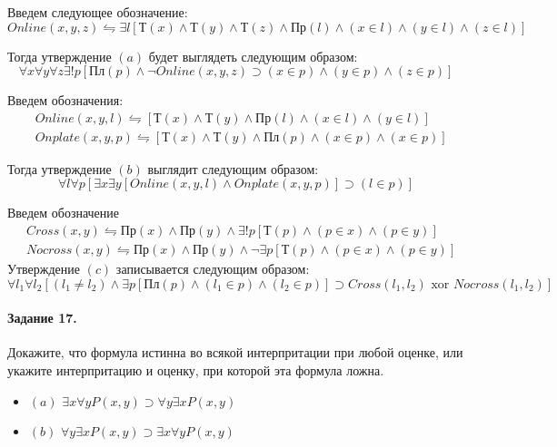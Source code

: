 \documentclass[a4paper,12pt]{article}
\begin{document}
\begin{Solution}
Введем следующее обозначение:
\[
	Online\left(x,y,z\right) \leftrightharpoons \exists l\left[\text{Т}\left(x\right)\land \text{Т}\left(y\right)\land\text{Т}\left(z\right)\land\text{Пр}\left(l\right)\land\left(x \in l\right)\land\left(y \in l\right)\land\left(z \in l\right)\right]
\]

Тогда утверждение $(a)$ будет выглядеть следующим образом:
\[
	\forall x \forall y \forall z \exists ! p \left[\text{Пл}\left(p\right) \land \neg Online\left(x,y,z\right)\supset\left(x \in p\right)\land\left(y \in p\right)\land\left(z \in p\right)\right]
\]

Введем обозначения:
\[
	\begin{split}
		& Online\left(x,y,l\right) \leftrightharpoons \left[\text{Т}\left(x\right)\land\text{Т}\left(y\right)\land\text{Пр}\left(l\right)\land\left(x \in l\right)\land\left(y \in l\right)\right] \\
		& Onplate\left(x,y,p\right) \leftrightharpoons \left[\text{Т}\left(x\right)\land\text{Т}\left(y\right)\land\text{Пл}\left(p\right)\land\left(x \in p\right)\land\left(x \in p\right)\right]
	\end{split}
\]

Тогда утверждение $(b)$ выглядит следующим образом:
\[
	\forall l \forall p \left[\exists x \exists y \left[Online\left(x,y,l\right)\land Onplate\left(x,y,p\right)\right]\supset\left(l \in p\right)\right]
\]

Введем обозначение
\[
	\begin{split}
		& Cross\left(x,y\right) \leftrightharpoons \text{Пр}\left(x\right)\land\text{Пр}\left(y\right)\land\exists !p \left[\text{Т}\left(p\right)\land\left(p \in x\right)\land\left(p \in y\right)\right] \\
		& Nocross\left(x,y\right) \leftrightharpoons \text{Пр}\left(x\right)\land\text{Пр}\left(y\right)\land\neg\exists p\left[\text{Т}\left(p\right)\land\left(p \in x\right)\land\left(p \in y\right)\right]
	\end{split}
\]
Утверждение $(c)$ записывается следующим образом:
\[
	\forall l_1 \forall l_2 \left[\left(l_1 \not= l_2\right)\land\exists p \left[\text{Пл}\left(p\right)\land\left(l_1 \in p\right)\land\left(l_2 \in p\right)\right]\supset Cross\left(l_1,l_2\right)\text{ xor }Nocross\left(l_1,l_2\right)\right]
\]
\end{Solution}

\paragraph{Задание 17.} Докажите, что формула истинна во всякой интерпритации при любой оценке, или укажите интерпритацию и оценку, при которой эта формула ложна.
\begin{itemize}
\item $(a)$ $\exists x\forall y P\left(x,y\right) \supset \forall y \exists x P\left(x,y\right)$

\item $(b)$ $\forall y \exists x P\left(x,y\right) \supset \exists x\forall y P\left(x,y\right)$
\end{itemize}
\end{document}
